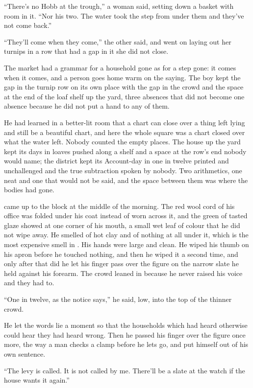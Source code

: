 “There's no Hobb at the trough,” a woman said, setting down a basket with room in it. “Nor his two. The water took the step from under them and they've not come back.”

“They'll come when they come,” the other said, and went on laying out her turnips in a row that had a gap in it she did not close.

The market had a grammar for a household gone as for a step gone: it comes when it comes, and a person goes home warm on the saying. The boy kept the gap in the turnip row on its own place with the gap in the crowd and the space at the end of the loaf shelf up the yard, three absences that did not become one absence because he did not put a hand to any of them.

He had learned in a better-lit room that a chart can close over a thing left lying and still be a beautiful chart, and here the whole square was a chart closed over what the water left. Nobody counted the empty places. The house up the yard kept its days in loaves pushed along a shelf and a space at the row's end nobody would name; the district kept its Account-day in one in twelve printed and unchallenged and the true subtraction spoken by nobody. Two arithmetics, one neat and one that would not be said, and the space between them was where the bodies had gone.

 came up to the block at the middle of the morning. The red wool cord of his office was folded under his coat instead of worn across it, and the green of tasted glaze showed at one corner of his mouth, a small wet leaf of colour that he did not wipe away. He smelled of hot clay and of nothing at all under it, which is the most expensive smell in . His hands were large and clean. He wiped his thumb on his apron before he touched nothing, and then he wiped it a second time, and only after that did he let his finger pass over the figure on the narrow slate he held against his forearm. The crowd leaned in because he never raised his voice and they had to.

“One in twelve, as the notice says,” he said, low, into the top of the thinner crowd.

He let the words lie a moment so that the households which had heard otherwise could hear they had heard wrong. Then he passed his finger over the figure once more, the way a man checks a clamp before he lets go, and put himself out of his own sentence.

“The levy is called. It is not called by me. There'll be a slate at the watch if the house wants it again.”


